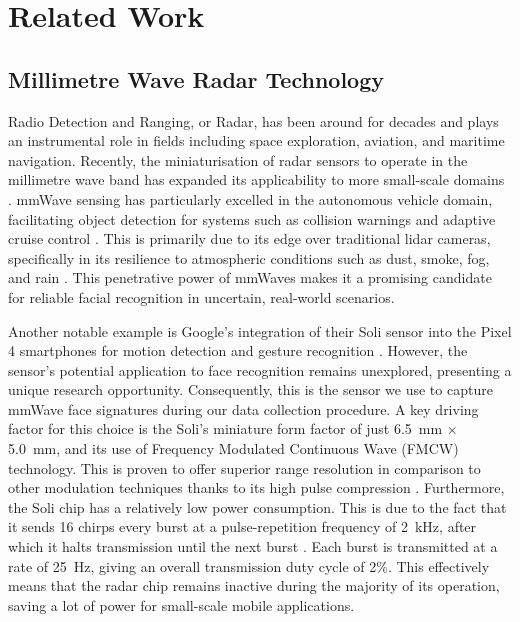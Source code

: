 \documentclass{mpaper}
\begin{document}
\section{Related Work}
\subsection{Millimetre Wave Radar Technology}
Radio Detection and Ranging, or Radar, has been around for decades and plays an instrumental role in fields including space exploration, aviation, and maritime navigation. Recently, the miniaturisation of radar sensors to operate in the millimetre wave band has expanded its applicability to more small-scale domains \cite{soumya2023recent}. mmWave sensing has particularly excelled in the autonomous vehicle domain, facilitating object detection for systems such as collision warnings and adaptive cruise control \cite{dfrobot}. This is primarily due to its edge over traditional lidar cameras, specifically in its resilience to atmospheric conditions such as dust, smoke, fog, and rain \cite{cadenceblog2022}. This penetrative power of mmWaves makes it a promising candidate for reliable facial recognition in uncertain, real-world scenarios. 

Another notable example is Google's integration of their Soli sensor into the Pixel 4 smartphones for motion detection and gesture recognition \cite{googleblog2020}. However, the sensor's potential application to face recognition remains unexplored, presenting a unique research opportunity. Consequently, this is the sensor we use to capture mmWave face signatures during our data collection procedure. A key driving factor for this choice is the Soli's miniature form factor of just \qty{6.5}{\mm} $\times$ \qty{5.0}{\mm}, and its use of Frequency Modulated Continuous Wave (FMCW) technology. This is proven to offer superior range resolution in comparison to other modulation techniques thanks to its high pulse compression \cite{mahafza2005radar}. Furthermore, the Soli chip has a relatively low power consumption. This is due to the fact that it sends 16 chirps every burst at a pulse-repetition frequency of \qty{2}{\kHz}, after which it halts transmission until the next burst \cite{hayashi2021radarnet, mitchell2023mmsense}. Each burst is transmitted at a rate of \qty{25}{\Hz}, giving an overall transmission duty cycle of 2\%. This effectively means that the radar chip remains inactive during the majority of its operation, saving a lot of power for small-scale mobile applications.
\end{document}
